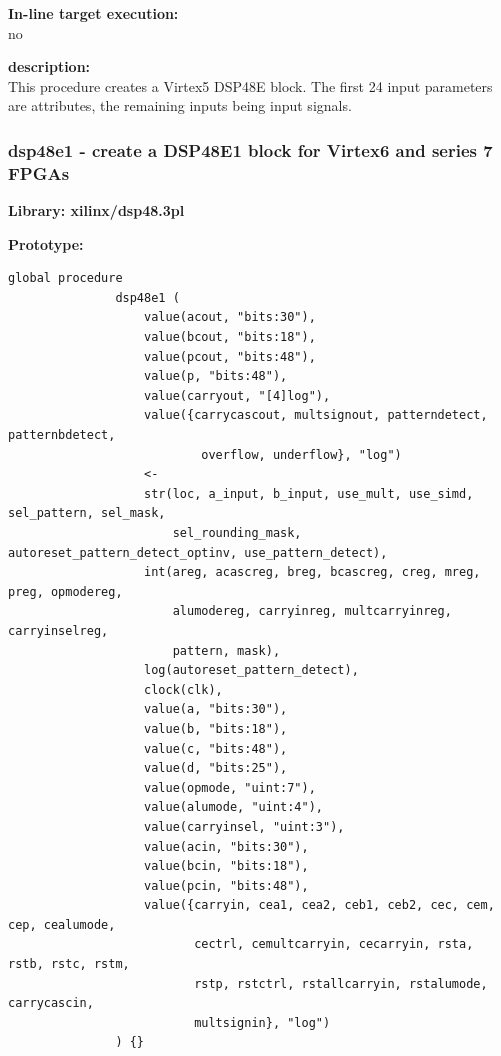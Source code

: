             {\bf In-line target execution:} \\
            no

            {\bf description:} \\
            This procedure creates a Virtex5 DSP48E block. The first 24 input
            parameters are attributes, the remaining inputs being input signals.


        \subsubsection{dsp48e1 - create a DSP48E1 block for Virtex6 and series 7 FPGAs}\label{sec:lpdsp48e1}

            {\bf Library: xilinx/dsp48.3pl}

            {\bf Prototype:} \\
            \vsp
            \begin{lstlisting}[gobble=12, language=threepl]
               global procedure
               dsp48e1 (
                   value(acout, "bits:30"),
                   value(bcout, "bits:18"),
                   value(pcout, "bits:48"),
                   value(p, "bits:48"),
                   value(carryout, "[4]log"),
                   value({carrycascout, multsignout, patterndetect, patternbdetect,
                           overflow, underflow}, "log")
                   <-   
                   str(loc, a_input, b_input, use_mult, use_simd, sel_pattern, sel_mask,
                       sel_rounding_mask, autoreset_pattern_detect_optinv, use_pattern_detect),
                   int(areg, acascreg, breg, bcascreg, creg, mreg, preg, opmodereg,
                       alumodereg, carryinreg, multcarryinreg, carryinselreg,
                       pattern, mask),
                   log(autoreset_pattern_detect),
                   clock(clk),
                   value(a, "bits:30"),
                   value(b, "bits:18"),
                   value(c, "bits:48"),
                   value(d, "bits:25"),
                   value(opmode, "uint:7"),
                   value(alumode, "uint:4"),
                   value(carryinsel, "uint:3"),
                   value(acin, "bits:30"),
                   value(bcin, "bits:18"),
                   value(pcin, "bits:48"),
                   value({carryin, cea1, cea2, ceb1, ceb2, cec, cem, cep, cealumode,
                          cectrl, cemultcarryin, cecarryin, rsta, rstb, rstc, rstm,
                          rstp, rstctrl, rstallcarryin, rstalumode, carrycascin,
                          multsignin}, "log")
               ) {}
            \end{lstlisting}

